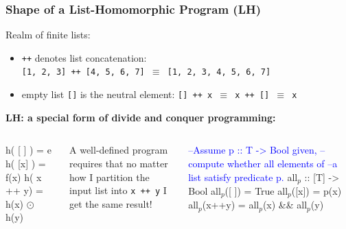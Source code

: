 \documentclass{beamer}
\newcommand{\blue}[1]{\textcolor{Blue}{{#1}}}
\newcommand{\emp}[1]{\textcolor{DikuRed}{ #1}}
\newcommand{\mymath}[1]{$ #1 $}
\newcommand{\myindx}[1]{_{#1}}
\begin{document}
\begin{frame}[fragile,t]
\frametitle{Shape of a List-Homomorphic Program (LH)}

Realm of finite lists:
\begin{itemize}
    \item {\tt ++} denotes list concatenation:\\
    {\tt [1, 2, 3] ++ [4, 5, 6, 7] $\equiv$ [1, 2, 3, 4, 5, 6, 7]}
    \item empty list {\tt []} is the neutral element:
        {\tt [] ++ x $\equiv$ x ++ [] $\equiv$ x}
\end{itemize}
\bigskip

\emp{\bf LH: a special form of divide and conquer programming:}
\begin{columns}
\begin{colorcode}[fontsize=\small]
h( [ ] )   = e
h( [x] )   = f(x)
h( x ++ y) = h(x) \mymath{\odot} h(y)
\end{colorcode}
\alert{A well-defined program requires that no matter how 
I partition the input list into {\tt x ++ y} I get the same result!}
\begin{colorcode}[fontsize=\small]
\blue{--Assume p :: T -> Bool given,}
\blue{--compute whether all elements of}
\blue{--a list satisfy predicate p.}
all\mymath{\myindx{p}} :: [T] -> Bool
all\mymath{\myindx{p}}([ ])  = True
all\mymath{\myindx{p}}([x])  = p(x) 
all\mymath{\myindx{p}}(x++y) = all\mymath{\myindx{p}}(x) && all\mymath{\myindx{p}}(y)
\end{colorcode}
\end{columns}

\end{frame}
\end{document}
